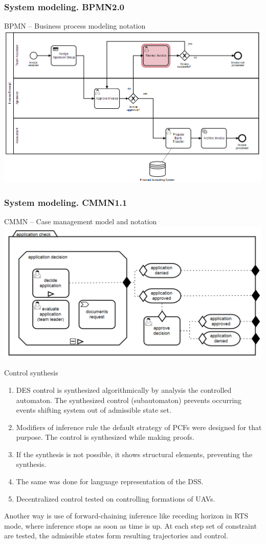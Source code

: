 \documentclass[10pt,dvipsnames]{beamer}
\begin{document}
\begin{frame}
  \frametitle{System modeling. BPMN2.0}
  BPMN -- Business process modeling notation
  \centering
    \includegraphics[width=1\linewidth]{qms-pics/bpmn.png}
\end{frame}
\begin{frame}
  \frametitle{System modeling. CMMN1.1}
  CMMN -- Case management model and notation
  \centering
    \includegraphics[width=1\linewidth]{qms-pics/cmmn.png}
\end{frame}


\begin{frame}{Control synthesis}
  \begin{enumerate}
  \item DES control is synthesized algorithmically by analysis the controlled automaton. The synthesized control (subautomaton) prevents occurring events shifting system out of admissible state set.
  \item Modifiers of inference rule the default strategy of PCFs were designed for that purpose. The control is synthesized while making proofs.
  \item If the synthesis is not possible, it shows structural elements, preventing the synthesis.
  \item The same was done for language representation of the DSS.
  \item Decentralized control tested on controlling formations of UAVs.
  \end{enumerate}
  Another way is use of forward-chaining inference like receding horizon in RTS mode, where inference stops as soon as time is up.  At each step set of constraint are tested, the admissible states form resulting trajectories and control.
\end{frame}
\end{document}
